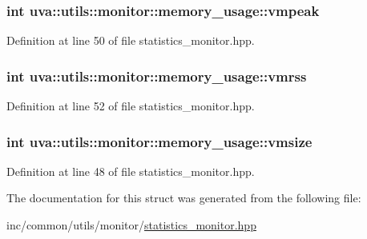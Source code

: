 \subsubsection[{vmpeak}]{\setlength{\rightskip}{0pt plus 5cm}int uva\+::utils\+::monitor\+::memory\+\_\+usage\+::vmpeak}\label{structuva_1_1utils_1_1monitor_1_1memory__usage_a7145c69ae9c7f75c38cd9a92df74f0e9}


Definition at line 50 of file statistics\+\_\+monitor.\+hpp.

\hypertarget{structuva_1_1utils_1_1monitor_1_1memory__usage_ab032109442efa2c08bd3085e562fc940}{}
\subsubsection[{vmrss}]{\setlength{\rightskip}{0pt plus 5cm}int uva\+::utils\+::monitor\+::memory\+\_\+usage\+::vmrss}\label{structuva_1_1utils_1_1monitor_1_1memory__usage_ab032109442efa2c08bd3085e562fc940}


Definition at line 52 of file statistics\+\_\+monitor.\+hpp.

\hypertarget{structuva_1_1utils_1_1monitor_1_1memory__usage_aa51584de084fc380578c457096a395ff}{}
\subsubsection[{vmsize}]{\setlength{\rightskip}{0pt plus 5cm}int uva\+::utils\+::monitor\+::memory\+\_\+usage\+::vmsize}\label{structuva_1_1utils_1_1monitor_1_1memory__usage_aa51584de084fc380578c457096a395ff}


Definition at line 48 of file statistics\+\_\+monitor.\+hpp.



The documentation for this struct was generated from the following file\+:\begin{DoxyCompactItemize}
\item 
inc/common/utils/monitor/\hyperlink{statistics__monitor_8hpp}{statistics\+\_\+monitor.\+hpp}\end{DoxyCompactItemize}
